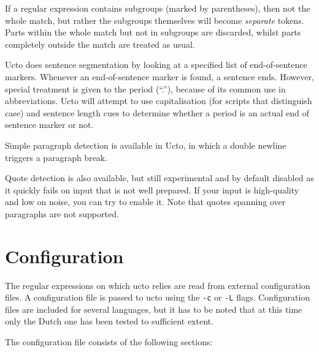 \documentclass[a4paper,12pt]{report}
\begin{document}
If a regular expression contains subgroups (marked by parentheses), then not the whole match, but rather the subgroups themselves will become \emph{separate} tokens. Parts within the whole match but not in subgroups are discarded, whilst parts completely outside the match are treated as usual.

Ucto does sentence segmentation by looking at a specified list of end-of-sentence markers. Whenever an end-of-sentence marker is found, a sentence ends. However, special treatment is given to the period (``.''), because of its common use in abbreviations. Ucto will attempt to use capitalisation (for scripts that distinguish case) and sentence length cues to determine whether a period is an actual end of sentence marker or not.

Simple paragraph detection is available in Ucto, in which a double newline triggers a paragraph break.

Quote detection is also available, but still experimental and by default disabled as it quickly fails on input that is not well prepared. If your input is high-quality and low on noise, you can try to enable it.  Note that quotes spanning over paragraphs are not supported.   

\section{Configuration}

The regular expressions on which ucto relies are read from external configuration files. A configuration file is passed to ucto using the \texttt{-c} or \texttt{-L} flags. Configuration files are included for several languages, but it has to be noted that at this time only the Dutch one has been tested to sufficient extent.   

The configuration file consists of the following sections:
\end{document}
